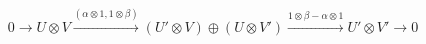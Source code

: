 $$0 \rightarrow U \otimes V \xrightarrow{(\alpha \otimes 1, 1 \otimes \beta)} (U' \otimes V) \oplus (U \otimes V') \xrightarrow{1 \otimes \beta - \alpha \otimes 1} U' \otimes V' \rightarrow 0$$
